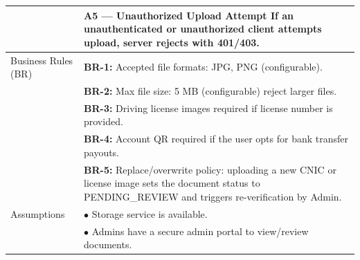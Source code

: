 \begin{longtable}{|>{\raggedright\arraybackslash}p{4cm}|>{\raggedright\arraybackslash}p{11cm}|}
& \textbf{A5 — Unauthorized Upload Attempt} \newline If an unauthenticated or unauthorized client attempts upload, server rejects with 401/403. \\
\hline
Business Rules (BR) & \textbf{BR-1:} Accepted file formats: JPG, PNG (configurable). \\
& \textbf{BR-2:} Max file size: 5 MB (configurable) reject larger files. \\
& \textbf{BR-3:} Driving license images required if license number is provided. \\
& \textbf{BR-4:} Account QR required if the user opts for bank transfer payouts. \\
& \textbf{BR-5:} Replace/overwrite policy: uploading a new CNIC or license image sets the document status to PENDING\_REVIEW and triggers re-verification by Admin. \\
\hline
Assumptions & $\bullet$ Storage service is available. \\
& $\bullet$ Admins have a secure admin portal to view/review documents. \\
\end{longtable}

